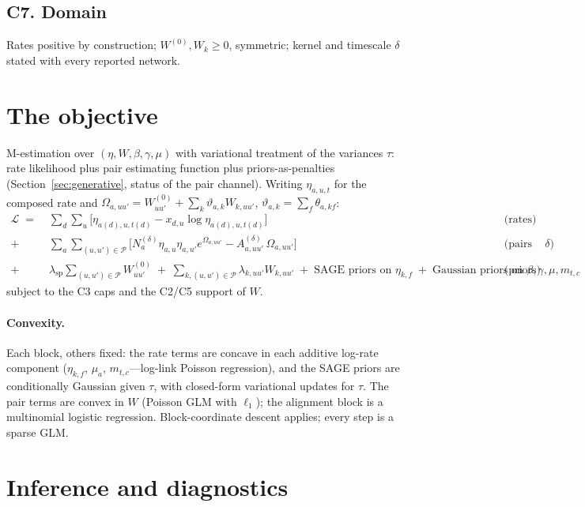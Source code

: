 \documentclass[11pt]{article}
\newcommand{\PP}{\mathcal{P}}
\newcommand{\Lcal}{\mathcal{L}}
\newcommand{\1}{\mathbb{1}}
\begin{document}
\subsection*{C7. Domain}
Rates positive by construction; $W^{(0)},W_k\ge0$, symmetric; kernel and timescale $\delta$ stated with every reported network.

\section{The objective}\label{sec:objective}

M-estimation over $(\eta,W,\beta,\gamma,\mu)$ with variational treatment of the variances $\tau$: rate likelihood plus pair estimating function plus priors-as-penalties (Section~\ref{sec:generative}, status of the pair channel). Writing $\eta_{a,u,t}$ for the composed rate and $\Omega_{a,uu'}=W^{(0)}_{uu'}+\sum_k\vartheta_{a,k}W_{k,uu'}$, $\vartheta_{a,k}=\sum_f\theta_{a,kf}$:
\begin{align*}
  \Lcal \;=\;
  &\sum_d\sum_u\Big[\eta_{a(d),u,t(d)}-x_{d,u}\log\eta_{a(d),u,t(d)}\Big]
  &&\text{(rates)}\\
  +\;&\sum_a\sum_{(u,u')\in\PP}\Big[N^{(\delta)}_a\eta_{a,u}\eta_{a,u'}e^{\Omega_{a,uu'}}-A^{(\delta)}_{a,uu'}\,\Omega_{a,uu'}\Big]
  &&\text{(pairs at }\delta\text{)}\\
  +\;&\lambda_{\text{sp}}\!\!\sum_{(u,u')\in\PP}\!\!W^{(0)}_{uu'}\;+\;\sum_{k,(u,u')\in\PP}\lambda_{k,uu'}W_{k,uu'}
  \;+\;\text{SAGE priors on }\eta_{k,f}\;+\;\text{Gaussian priors on }\beta,\gamma,\mu,m_{t,c}
  &&\text{(priors)}
\end{align*}
subject to the C3 caps and the C2/C5 support of $W$.

\paragraph{Convexity.} Each block, others fixed: the rate terms are concave in each additive log-rate component ($\eta_{k,f}$, $\mu_a$, $m_{t,c}$---log-link Poisson regression), and the SAGE priors are conditionally Gaussian given $\tau$, with closed-form variational updates for $\tau$. The pair terms are convex in $W$ (Poisson GLM with $\ell_1$); the alignment block is a multinomial logistic regression. Block-coordinate descent applies; every step is a sparse GLM.

\section{Inference and diagnostics}\label{sec:inference}
\end{document}
